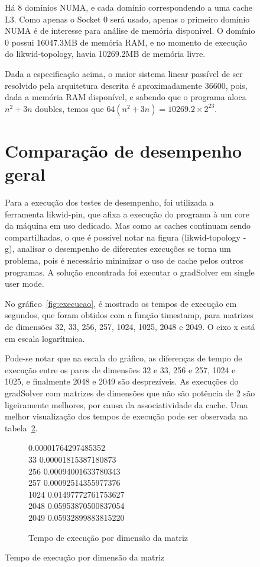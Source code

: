 \documentclass[12pt]{article}
\begin{document}
\begin{figure}[ht]
Há 8 domínios NUMA, e cada domínio correspondendo a uma cache L3. Como apenas o
Socket 0 será usado, apenas o primeiro domínio NUMA é de interesse para análise
de memória disponivel. O domínio 0 possui 16047.3MB de memória RAM, e no momento
de execução do likwid-topology, havia 10269.2MB de memória livre.

Dada a especificação acima, o maior sistema linear passível de ser resolvido
pela arquitetura descrita é aproximadamente 36600, pois, dada a memória RAM
disponível, e sabendo que o programa aloca $n^2 + 3n$ doubles, temos que $64(n^2 +
3n) = 10269.2\times2^{23}$.

\section{Comparação de desempenho geral}\label{sec:desempenhoGeral}

Para a execução dos testes de desempenho, foi utilizada a ferramenta likwid-pin,
que afixa a execução do programa à um core da máquina em uso dedicado. Mas como
as caches continuam sendo compartilhadas, o que é possível notar na figura
(likwid-topology -g), analisar o desempenho de diferentes execuções se torna um
problema, pois é necessário minimizar o uso de cache pelos outros programas. A
solução encontrada foi executar o gradSolver em single user mode.

No gráfico~\ref{fig:execucao}, é mostrado os tempos de execução em segundos, que
foram obtidos com a função timestamp, para matrizes de dimensões 32, 33, 256,
257, 1024, 1025, 2048 e 2049. O eixo x está em escala logarítmica.

Pode-se notar que na escala do gráfico, as diferenças de tempo de execução entre
os pares de dimensões 32 e 33, 256 e 257, 1024 e 1025, e finalmente 2048 e 2049
são desprezíveis. As execuções do gradSolver com matrizes de dimensões que não
são potência de 2 são ligeiramente melhores, por causa da associatividade da
cache. Uma melhor visualização dos tempos de execução pode ser observada na
tabela~\ref{fig:tabelaExecucoes}.

\begin{figure}[htb]
\begin{tt}      0.00001764297485352\\
    33      0.00001815387180873\\
    256     0.00094001633780343\\
    257     0.00092514355977376\\
    1024    0.01497772761753627\\
    2048    0.05953870500837054\\
    2049    0.05932899883815220\\
\end{tt}\caption{Tempo de execução por dimensão da matriz}\label{fig:tabelaExecucoes}
\end{figure}


\end{figure}
\end{document}
